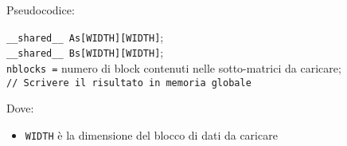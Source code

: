 \begin{questions}
\begin{solution}
        Pseudocodice:
        \begin{center}
            \begin{minipage}{.9\textwidth}
                \begin{tcolorbox}[
                    colback=white,
                    sharp corners,
                    boxrule=.3mm,
                    left=20pt,
                    top=0pt,
                    bottom=0pt,
                    colbacktitle=white,
                    coltitle=black
                    ]
                    \LinesNumbered
                    \begin{algorithm}[H]
                        \SetAlgoNoEnd
                        \texttt{\_\_shared\_\_ As[WIDTH][WIDTH]}; \\
                        \texttt{\_\_shared\_\_ Bs[WIDTH][WIDTH]}; \\
                        \texttt{nblocks =} numero di block contenuti nelle sotto-matrici da caricare; \\
                        \texttt{// Scrivere il risultato in memoria globale}
                    \end{algorithm}
                \end{tcolorbox}
            \end{minipage}
        \end{center}
        
        Dove: 
        \begin{itemize}
            \item \texttt{WIDTH} è la dimensione del blocco di dati da caricare
            

\end{itemize}
\end{solution}
\end{questions}
